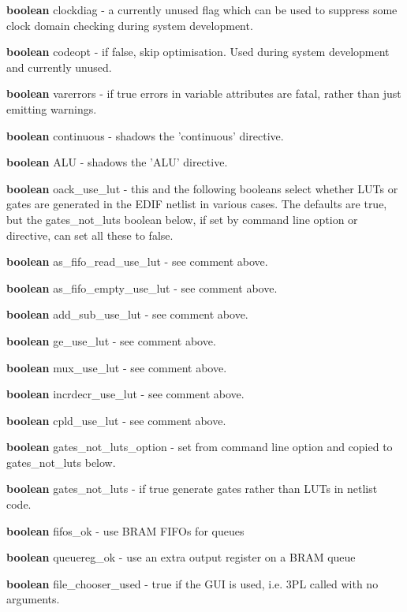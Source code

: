 \documentclass[10pt,a4paper,twoside,fleqn]{book}
\begin{document}
            {\bf boolean} clockdiag - a currently unused flag which can be used to
            suppress some
            clock domain checking during system development.

            {\bf boolean} codeopt - if false, skip optimisation. Used during system development
            and currently unused.

            {\bf boolean} varerrors - if true errors in variable attributes are
            fatal, rather than just emitting warnings.

            {\bf boolean} continuous - shadows the 'continuous' directive.

            {\bf boolean} ALU - shadows the 'ALU' directive.

            {\bf boolean} oack\_use\_lut - this and the following booleans select
            whether LUTs or gates are generated in the EDIF netlist in various
            cases. The defaults are true, but the gates\_not\_luts boolean
            below, if set by command line option or directive, can set all these
            to false.

            {\bf boolean} as\_fifo\_read\_use\_lut - see comment above.

            {\bf boolean} as\_fifo\_empty\_use\_lut - see comment above.

            {\bf boolean} add\_sub\_use\_lut - see comment above.

            {\bf boolean} ge\_use\_lut - see comment above.

            {\bf boolean} mux\_use\_lut - see comment above.

            {\bf boolean} incrdecr\_use\_lut - see comment above.

            {\bf boolean} cpld\_use\_lut - see comment above.

            {\bf boolean} gates\_not\_luts\_option - set from command line option and copied to
            gates\_not\_luts below.

            {\bf boolean} gates\_not\_luts - if true generate gates rather than LUTs
            in netlist code.

            {\bf boolean} fifos\_ok - use BRAM FIFOs for queues

            {\bf boolean} queuereg\_ok - use an extra output register on a BRAM queue

            {\bf boolean} file\_chooser\_used - true if the GUI is used, i.e. 3PL called with
            no arguments.
\end{document}
